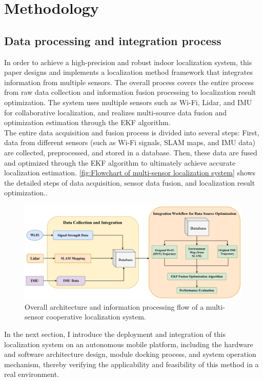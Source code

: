 \documentclass[12pt,a4paper]{article}
\numberwithin{equation}{section}
\begin{document}
\section{Methodology}
\subsection{Data processing and integration process}
In order to achieve a high-precision and robust indoor localization system, this paper designs and implements a localization method framework that integrates information from multiple sensors. The overall process covers the entire process from raw data collection and information fusion processing to localization result optimization. The system uses multiple sensors such as Wi-Fi, Lidar, and IMU for collaborative localization, and realizes multi-source data fusion and optimization estimation through the EKF algorithm.\\
The entire data acquisition and fusion process is divided into several steps: First, data from different sensors (such as Wi-Fi signals, SLAM maps, and IMU data) are collected, preprocessed, and stored in a database. Then, these data are fused and optimized through the EKF algorithm to ultimately achieve accurate localization estimation. \autoref{fig:Flowchart of multi-sensor localization system} shows the detailed steps of data acquisition, sensor data fusion, and localization result optimization..\\
\begin{figure}[H]
    \centering
    \includegraphics[width=\linewidth]{images/Overview_plus.png}
    \caption{Overall architecture and information processing flow of a multi-sensor cooperative localization system.}
    \label{fig:Flowchart of multi-sensor localization system}
\end{figure}
\noindent In the next section, I introduce the deployment and integration of this localization system on an autonomous mobile platform, including the hardware and software architecture design, module docking process, and system operation mechanism, thereby verifying the applicability and feasibility of this method in a real environment.
\end{document}
